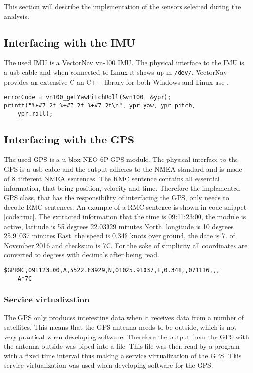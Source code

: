 \label{sub:implementation_of_sensors}
This section will describe the implementation of the sensors selected during the analysis.


\subsection{Interfacing with the IMU}\label{sec:interface_IMU}
The used IMU is a VectorNav vn-100 IMU.
The physical interface to the IMU is a usb cable and when connected to Linux it shows up in \texttt{/dev/}.
VectorNav provides an extensive C an C++ library for both Windows and Linux use \cite{vectornav}. 


\begin{lstlisting}[caption=IMU CODE......,label=code:rmc]
errorCode = vn100_getYawPitchRoll(&vn100, &ypr);
printf("%+#7.2f %+#7.2f %+#7.2f\n", ypr.yaw, ypr.pitch, 
	ypr.roll);
\end{lstlisting}

\subsection{Interfacing with the GPS}\label{sec:interface_GPS}
The used GPS is a u-blox NEO-6P GPS module.
The physical interface to the GPS is a usb cable and the output adheres to the NMEA standard and is made of 8 different NMEA sentences.
The RMC sentence contains all essential information, that being position, velocity and time.
Therefore the implemented GPS class, that has the responsibility of interfacing the GPS, only needs to decode RMC sentences.
An example of a RMC sentence is shown in code snippet \ref{code:rmc}.
The extracted information that the time is 09:11:23:00, the module is active, latitude is 55 degrees 22.03929 minutes North, longitude is 10 degrees 25.91037 minutes East, the speed is 0.348 knots over ground, the date is 7. of November 2016 and checksum is 7C.
For the sake of simplicity all coordinates are converted to degress with decimals after being read. 
\begin{lstlisting}[caption=RMC sentence.,label=code:rmc]
$GPRMC,091123.00,A,5522.03929,N,01025.91037,E,0.348,,071116,,,
	A*7C
\end{lstlisting}

\subsubsection{Service virtualization}
The GPS only produces interesting data when it receives data from a number of satellites. 
This means that the GPS antenna needs to be outside, which is not very practical when developing software.
Therefore the output from the GPS with the antenna outside was piped into a file.
This file was then read by a program with a fixed time interval thus making a service virtualization of the GPS.
This service virtualization was used when developing software for the GPS.